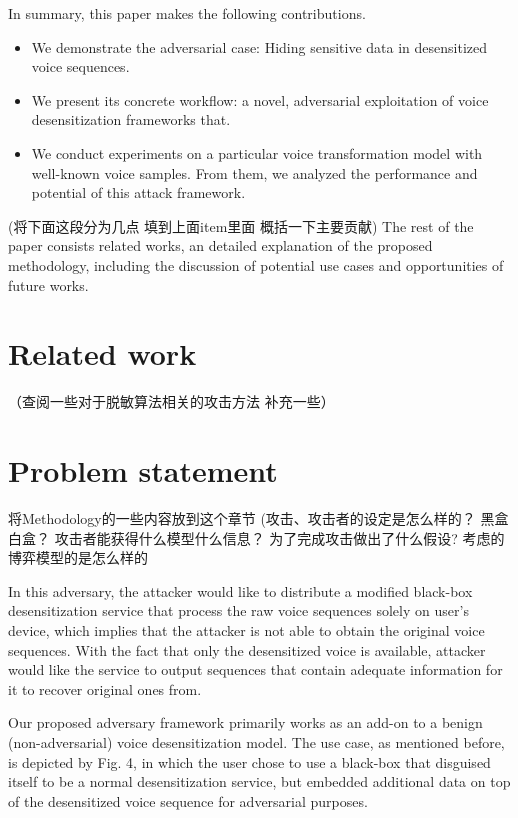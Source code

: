 \documentclass[journal]{IEEEtran} %
\begin{document}
\begin{CJK*}{UTF8}{gbsn}
In summary, this paper makes the following contributions.

\begin{itemize}

\item We demonstrate the adversarial case: Hiding sensitive data in desensitized voice sequences.

\item We present its concrete workflow: a novel, adversarial exploitation of voice desensitization frameworks that.

\item We conduct experiments on a particular voice transformation model with well-known voice samples. From them, we analyzed the performance and potential of this attack framework.

\end{itemize}
(将下面这段分为几点 填到上面item里面 概括一下主要贡献)
The rest of the paper consists related works, an detailed explanation of the proposed methodology, including the discussion of potential use cases and opportunities of future works.

\section{Related work}
（查阅一些对于脱敏算法相关的攻击方法 补充一些）

\section{Problem statement}
将Methodology的一些内容放到这个章节
(攻击、攻击者的设定是怎么样的？ 黑盒白盒？ 攻击者能获得什么模型什么信息？ 为了完成攻击做出了什么假设? 考虑的博弈模型的是怎么样的

In this adversary, the attacker would like to distribute a modified black-box desensitization service that process the raw voice sequences solely on user's device, which implies that the attacker is not able to obtain the original voice sequences. With the fact that only the desensitized voice is available, attacker would like the service to output sequences that contain adequate information for it to recover original ones from.

Our proposed adversary framework primarily works as an add-on to a benign (non-adversarial) voice desensitization model. The use case, as mentioned before, is depicted by Fig. 4, in which the user chose to use a black-box that disguised itself to be a normal desensitization service, but embedded additional data on top of the desensitized voice sequence for adversarial purposes.


\end{CJK*}
\end{document}
